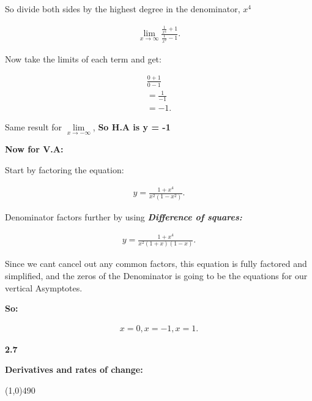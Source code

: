 \documentclass{report}
\begin{document}
        \bigbreak \noindent 
        So divide both sides by the highest degree in the denominator, \textbf{\textit{$x^4$}}
        
        \begin{align*}
            \lim\limits_{x \to \infty}{ \frac{\frac{1}{x^4} + 1}{ \frac{1}{x^2} - 1}} 
        .\end{align*}

        \bigbreak \noindent 
        Now take the limits of each term and get:

        \begin{align*}
           \frac{0 + 1}{0 - 1} \\
        = \frac{1}{-1} \\ 
        = -1
        .\end{align*}

        \bigbreak \noindent 
        Same result for $\lim\limits_{x \to - \infty}{}$, \textbf{So H.A is y = -1}

        \bigbreak \noindent \bigbreak \noindent 
        \textbf{Now for V.A:}

        \bigbreak \noindent 
        Start by factoring the equation:

        \begin{align*}
            y = \frac{1 + x^4}{x^2 \left(1 - x^2\right)}
        .\end{align*}

        \bigbreak \noindent 
        Denominator factors further by using \textbf{\textit{Difference of squares:}}

        \begin{align*}
            y = \frac{1 + x^4}{x^2 \left(1 + x\right) \left(1 - x\right)}
        .\end{align*}

        \bigbreak \noindent 
        Since we cant cancel out any common factors, this equation is fully factored and simplified,
        and the zeros of the Denominator is going to be the equations for our vertical Asymptotes.

        \bigbreak \noindent 
        \textbf{So:}

        \begin{align*}
            x = 0, x = -1, x = 1
        .\end{align*}

        \pagebreak \bigbreak \noindent
        \begin{Large}
            \begin{mdframed}
                \begin{center}
                    \textbf{2.7}
                \end{center}
            \end{mdframed}
        \end{Large}
        \begin{Large}
            \begin{center}
                \textbf{Derivatives and rates of change:}
            \end{center}
        \end{Large}
        \line(1,0){490}
\end{document}
